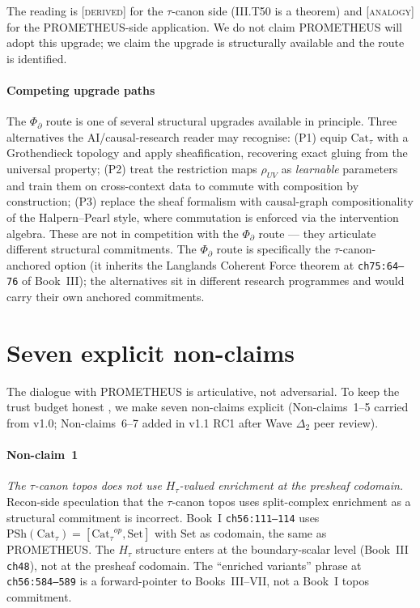 \documentclass{pantarhei-researchnote}
\newcommand{\DERIV}{\textsc{[derived]}}
\newcommand{\ANALOGY}{\textsc{[analogy]}}
\newcommand{\PsiD}{\ensuremath{\Phi_{\partial}}}
\newcommand{\Cattau}{\ensuremath{\mathrm{Cat}_{\tau}}}
\newcommand{\PSh}{\ensuremath{\mathrm{PSh}}}
\begin{document}
The reading is \DERIV{} for the $\tau$-canon side (III.T50 is a
theorem) and \ANALOGY{} for the PROMETHEUS-side application. We do
not claim PROMETHEUS will adopt this upgrade; we claim the upgrade
is structurally available and the route is identified.

\paragraph{Competing upgrade paths}
The $\PsiD$ route is one of several structural upgrades available
in principle. Three alternatives the AI/causal-research reader
may recognise: (P1) equip $\Cattau$ with a Grothendieck topology
and apply sheafification, recovering exact gluing from the
universal property; (P2) treat the restriction maps $\rho_{UV}$ as
\emph{learnable} parameters and train them on cross-context
data to commute with composition by construction; (P3) replace the
sheaf formalism with causal-graph compositionality of the
Halpern--Pearl style, where commutation is enforced via the
intervention algebra. These are not in competition with the $\PsiD$
route --- they articulate different structural commitments. The
$\PsiD$ route is specifically the $\tau$-canon-anchored option (it
inherits the Langlands Coherent Force theorem at \texttt{ch75:64--76}
of Book~III); the alternatives sit in different research programmes
and would carry their own anchored commitments.

\section{Seven explicit non-claims}
\label{sec:non-claims}

The dialogue with PROMETHEUS is articulative, not adversarial. To
keep the trust budget honest \cite{FuchsFuchs-foundations-billiards-v1},
we make seven non-claims explicit (Non-claims~1--5 carried from
v1.0; Non-claims~6--7 added in v1.1 RC1 after Wave $\Delta_{2}$
peer review).

\paragraph{Non-claim~1}
\emph{The $\tau$-canon topos does not use $H_{\tau}$-valued
enrichment at the presheaf codomain.} Recon-side speculation
\cite{PantaRhei-BookI} that the $\tau$-canon topos uses
split-complex enrichment as a structural commitment is incorrect.
Book~I \texttt{ch56:111--114} uses $\PSh(\Cattau) = [\Cattau^{op},
\mathrm{Set}]$ with $\mathrm{Set}$ as codomain, the same as
PROMETHEUS. The $H_{\tau}$ structure enters at the boundary-scalar
level (Book~III \texttt{ch48}), not at the presheaf codomain. The
``enriched variants'' phrase at \texttt{ch56:584--589} is a
forward-pointer to Books~III--VII, not a Book~I topos commitment.
\end{document}
